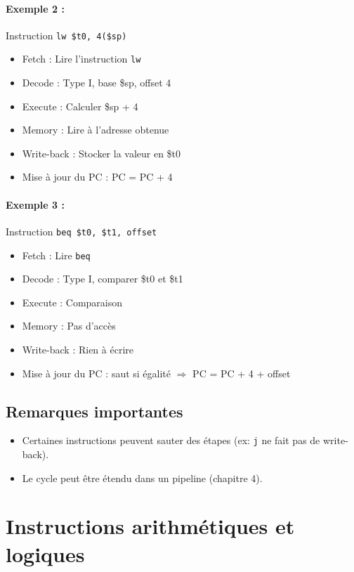 \documentclass[12pt,a4paper]{article}
\begin{document}
\paragraph{Exemple 2 :} Instruction \texttt{lw \$t0, 4(\$sp)}
\begin{itemize}
  \item Fetch : Lire l'instruction \texttt{lw}
  \item Decode : Type I, base \$sp, offset 4
  \item Execute : Calculer \$sp + 4
  \item Memory : Lire à l'adresse obtenue
  \item Write-back : Stocker la valeur en \$t0
  \item Mise à jour du PC : PC = PC + 4
\end{itemize}

\paragraph{Exemple 3 :} Instruction \texttt{beq \$t0, \$t1, offset}
\begin{itemize}
  \item Fetch : Lire \texttt{beq}
  \item Decode : Type I, comparer \$t0 et \$t1
  \item Execute : Comparaison
  \item Memory : Pas d'accès
  \item Write-back : Rien à écrire
  \item Mise à jour du PC : saut si égalité $\Rightarrow$ PC = PC + 4 + offset
\end{itemize}

\subsection{Remarques importantes}
\begin{itemize}
  \item Certaines instructions peuvent sauter des étapes (ex: \texttt{j} ne fait pas de write-back).
  \item Le cycle peut être étendu dans un pipeline (chapitre 4).
\end{itemize}

\newpage

\section{Instructions arithmétiques et logiques}
\end{document}
